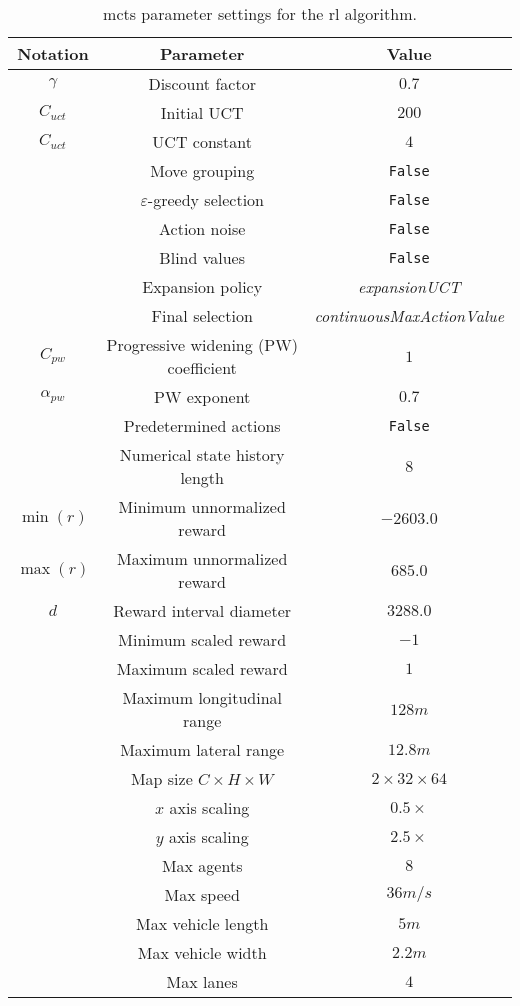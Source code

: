 \begin{table}[H]
    \centering
    \begin{tabular}{c c c}
    \toprule
    \textbf{Notation} & \textbf{Parameter} & \textbf{Value}\\
    \toprule
    $\gamma$ & Discount factor & $0.7$ \\
    $C_{uct}$ & Initial UCT & $200$ \\
    $C_{uct}$ & UCT constant & $4$ \\ 
     & Move grouping & \texttt{False} \\
     & $\varepsilon$-greedy selection & \texttt{False} \\
     & Action noise & \texttt{False} \\
     & Blind values & \texttt{False} \\
     & Expansion policy & \emph{expansionUCT} \\
     & Final selection & \emph{continuousMaxActionValue} \\
    $C_{pw}$ & Progressive widening (PW) coefficient & $1$ \\
    $\alpha_{pw}$ & PW exponent & $0.7$ \\
    & Predetermined actions & \texttt{False} \\
    & Numerical state history length & $8$ \\
    $\min(r)$ & Minimum unnormalized reward & $-2603.0$ \\
    $\max(r)$& Maximum unnormalized reward & $685.0$ \\
    $d$ & Reward interval diameter & $3288.0$ \\
    & Minimum scaled reward & $-1$ \\
    & Maximum scaled reward & $1$ \\
    & Maximum longitudinal range & $128m$ \\
    & Maximum lateral range & $12.8m$ \\
    & Map size $C \times H \times W$ & $2 \times 32 \times 64$ \\
    & $x$ axis scaling & $0.5 \times$ \\
    & $y$ axis scaling & $2.5 \times$ \\
    & Max agents & $8$ \\
    & Max speed & $36 m/s$ \\
    & Max vehicle length & $5m$ \\
    & Max vehicle width & $2.2m$ \\
    & Max lanes & $4$ \\
    \toprule
    \end{tabular}
    \caption[MCTS hyperparameters for the RL algorithm]{\gls{mcts} parameter settings for the \gls{rl} algorithm.}
    \label{tab:mcts_hyperparams}
\end{table}

